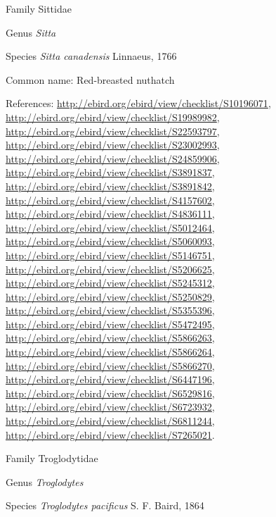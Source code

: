 \documentclass[9pt, article]{memoir}
\begin{document}
\begin{multicols}{2}
\vspace{6pt}\noindent\hspace{24pt}Family Sittidae


\vspace{6pt}\noindent\hspace{30pt}Genus \textit{Sitta}


\vspace{6pt}\noindent\hspace{36pt}Species \textit{Sitta canadensis} Linnaeus, 1766


Common name: Red-breasted nuthatch

References: 
\url{http://ebird.org/ebird/view/checklist/S10196071}, 
\url{http://ebird.org/ebird/view/checklist/S19989982}, 
\url{http://ebird.org/ebird/view/checklist/S22593797}, 
\url{http://ebird.org/ebird/view/checklist/S23002993}, 
\url{http://ebird.org/ebird/view/checklist/S24859906}, 
\url{http://ebird.org/ebird/view/checklist/S3891837}, 
\url{http://ebird.org/ebird/view/checklist/S3891842}, 
\url{http://ebird.org/ebird/view/checklist/S4157602}, 
\url{http://ebird.org/ebird/view/checklist/S4836111}, 
\url{http://ebird.org/ebird/view/checklist/S5012464}, 
\url{http://ebird.org/ebird/view/checklist/S5060093}, 
\url{http://ebird.org/ebird/view/checklist/S5146751}, 
\url{http://ebird.org/ebird/view/checklist/S5206625}, 
\url{http://ebird.org/ebird/view/checklist/S5245312}, 
\url{http://ebird.org/ebird/view/checklist/S5250829}, 
\url{http://ebird.org/ebird/view/checklist/S5355396}, 
\url{http://ebird.org/ebird/view/checklist/S5472495}, 
\url{http://ebird.org/ebird/view/checklist/S5866263}, 
\url{http://ebird.org/ebird/view/checklist/S5866264}, 
\url{http://ebird.org/ebird/view/checklist/S5866270}, 
\url{http://ebird.org/ebird/view/checklist/S6447196}, 
\url{http://ebird.org/ebird/view/checklist/S6529816}, 
\url{http://ebird.org/ebird/view/checklist/S6723932}, 
\url{http://ebird.org/ebird/view/checklist/S6811244}, 
\url{http://ebird.org/ebird/view/checklist/S7265021}.

\vspace{6pt}\noindent\hspace{24pt}Family Troglodytidae


\vspace{6pt}\noindent\hspace{30pt}Genus \textit{Troglodytes}


\vspace{6pt}\noindent\hspace{36pt}Species \textit{Troglodytes pacificus} S. F. Baird, 1864



\end{multicols}
\end{document}
